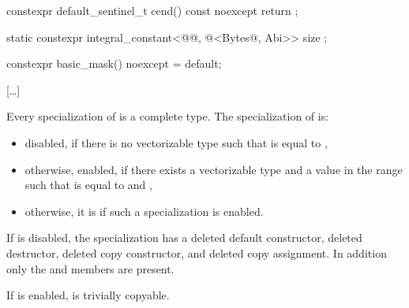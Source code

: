 \begin{wgText}\setcounter{Paras}{0}
\begin{codeblock}
    constexpr default_sentinel_t cend() const noexcept { return {}; }

    static constexpr integral_constant<@@, @<Bytes\wgRem{>}@, Abi>>
      size {};

    constexpr basic_mask() noexcept = default;
\end{codeblock}

[\ldots]

\pnum
Every specialization of  is a complete type.
The specialization of  is:
\begin{itemize}
 \item
   disabled, if there is no vectorizable type  such that 
   is equal to ,
 \item
   otherwise, enabled, if there exists a vectorizable type  and a
   value  in the range  such that  is equal
   to  and  
   ,
 \item
   otherwise, it is  if such a specialization is enabled.
\end{itemize}

If  is disabled, the specialization has a
deleted default constructor, deleted destructor, deleted copy constructor, and
deleted copy assignment.
In addition only the  and  members are
present.

If  is enabled,
 is trivially copyable.


\end{wgText}


